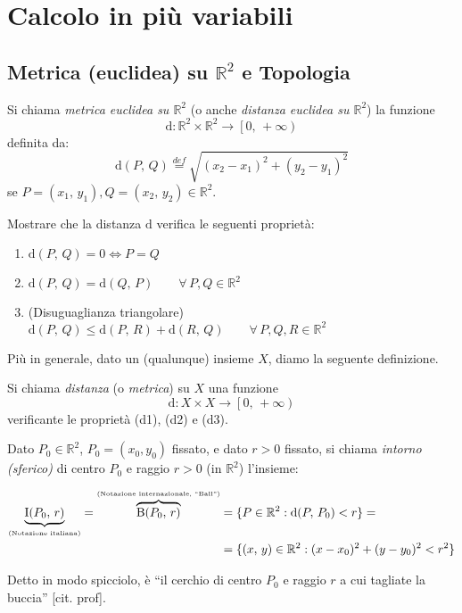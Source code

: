 \graphicspath{{01_calcolo_in_piu_variabili/figures/PNG/}{01_calcolo_in_piu_variabili/figures/PDF/}{01_calcolo_in_piu_variabili/figures/}}

\chapter{Calcolo in più variabili}
\copyrightnotice
\section{Metrica (euclidea) su $\mathbb{R}^2$ e Topologia}
\begin{definition}
Si chiama \emph{metrica euclidea su $\mathbb{R}^2$} (o anche \emph{distanza euclidea su $\mathbb{R}^2$}) la funzione
$$\mathrm{d}:\mathbb{R}^2 \times \mathbb{R}^2 \longrightarrow \left[0,\, +\infty\right)$$
definita da:
$$\mathrm{d}(P,\, Q) \overset{def}{=} \sqrt{(x_2-x_1)^2+(y_2-y_1)^2}$$
se $P=(x_1,\, y_1),Q=(x_2,\, y_2) \in \mathbb{R}^2$.
\end{definition}

\begin{exer}
Mostrare che la distanza $\mathrm{d}$ verifica le seguenti proprietà:
\begin{enumerate}[labelindent=\parindent,leftmargin=*,label=\textnormal{(d\arabic*)},start=1]
\item $\mathrm{d}(P,\, Q) = 0 \Longleftrightarrow P=Q$
\item $\mathrm{d}(P,\, Q) = \mathrm{d}(Q,\, P) \qquad \forall \, P,Q \in \mathbb{R}^2$
\item (Disuguaglianza triangolare) $\mathrm{d}(P,\, Q) \leq \mathrm{d}(P,\, R) + \mathrm{d}(R,\, Q) \qquad \forall \, P,Q,R \in \mathbb{R}^2$
\end{enumerate}
\end{exer}

Più in generale, dato un (qualunque) insieme $X$, diamo la seguente definizione.
\begin{definition}
Si chiama \emph{distanza} (o \emph{metrica}) su $X$ una funzione
$$\mathrm{d}:X \times X \longrightarrow \left[0,\, +\infty\right)$$
verificante le proprietà \textnormal{(d1)}, \textnormal{(d2)} e \textnormal{(d3)}.
\end{definition}

\begin{definition}
Dato $P_0 \in \mathbb{R}^2$, $P_0 = (x_0, y_0)$ fissato, e dato $r>0$ fissato, si chiama \emph{intorno (sferico)} di centro $P_0$ e raggio $r>0$ (in $\mathbb{R}^2$) l'insieme:
\begin{center}
\begin{align*}
\underbrace{\mathrm{I}(P_0,\, r)}_{\text{\tiny (Notazione italiana)}} =
\overbrace{\mathrm{B}(P_0,\, r)}^{\text{\tiny (Notazione internazionale, ``Ball'')}} &=
\lbrace P \in \mathbb{R}^2 : \mathrm{d}(P,\, P_0) < r \rbrace =\\
&= \lbrace (x,\, y) \in \mathbb{R}^2 : (x-x_0)^2+(y-y_0)^2 < r^2 \rbrace
\end{align*}
\end{center}
Detto in modo spicciolo, è ``il cerchio di centro $P_0$ e raggio $r$ a cui tagliate la buccia'' \textnormal{[cit. prof]}.
\end{definition}

